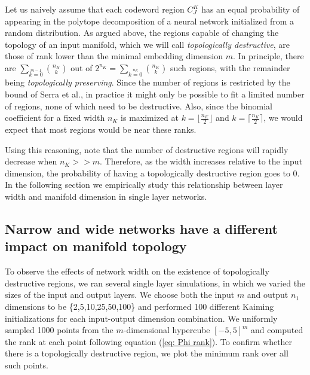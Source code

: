 Let us naively assume that each codeword region $C^K_J$ has an equal probability of appearing in the polytope decomposition of a neural network initialized from a random distribution. As argued above, the regions capable of changing the topology of an input manifold, which we will call \textit{topologically destructive}, are those of rank lower than the minimal embedding dimension $m$. In principle, there are $\sum\limits_{k=0}\limits^{m-1} \binom{n_K}{k}$ out of $2^{n_K} = \sum\limits_{k=0}\limits^{n_K} \binom{n_K}{k}$ such regions, with the remainder being \textit{topologically preserving}. Since the number of regions is restricted by the bound of Serra et al., in practice it might only be possible to fit a limited number of regions, none of which need to be destructive. Also, since the binomial coefficient for a fixed width $n_K$ is maximized at $k=\lfloor\frac{n_K}{2}\rfloor$ and $k=\lceil\frac{n_K}{2}\rceil$, we would expect that most regions would be near these ranks.



Using this reasoning, note that the number of destructive regions will rapidly decrease when $n_K>>m$. Therefore, as the width increases relative to the input dimension, the probability of having a topologically destructive region goes to 0. In the following section we empirically study this relationship between layer width and manifold dimension in single layer networks.

\subsection{Narrow and wide networks have a different impact on manifold topology}

To observe the effects of network width on the existence of topologically destructive regions, we ran several single layer simulations, in which we varied the sizes of the input and output layers. We choose both the input $m$ and output $n_1$ dimensions to be \{2,5,10,25,50,100\} and performed 100 different Kaiming initializations \cite{he2015delving} for each input-output dimension combination. We uniformly sampled 1000 points from the $m$-dimensional hypercube $[-5,5]^m$ and computed the rank at each point following equation (\ref{eq: Phi rank}). To confirm whether there is a topologically destructive region, we plot the minimum rank over all such points.


